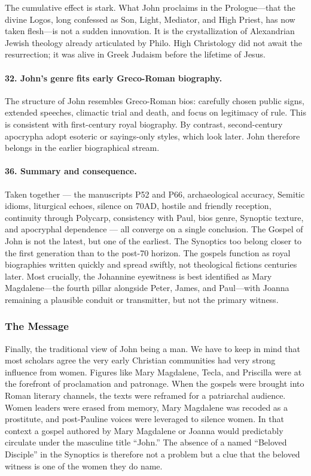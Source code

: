 The cumulative effect is stark.
What John proclaims in the Prologue—that the divine Logos, long confessed as Son, Light, Mediator, and High Priest, has now taken flesh—is not a sudden innovation.
It is the crystallization of Alexandrian Jewish theology already articulated by Philo.
High Christology did not await the resurrection; it was alive in Greek Judaism before the lifetime of Jesus.

\paragraph{32.
John’s genre fits early Greco-Roman biography.}\label{par:johns-genre-fits-early-greco-roman-biography.}

The structure of John resembles Greco-Roman bios: carefully chosen public signs, extended speeches, climactic trial and death, and focus on legitimacy of rule.
This is consistent with first-century royal biography.
By contrast, second-century apocrypha adopt esoteric or sayings-only styles, which look later.
John therefore belongs in the earlier biographical stream.

\paragraph{36.
Summary and consequence.}\label{par:summary-and-consequence.}

Taken together --- the manuscripts P52 and P66, archaeological accuracy, Semitic idioms, liturgical echoes, silence on 70AD, hostile and friendly reception, continuity through Polycarp, consistency with Paul, bios genre, Synoptic texture, and apocryphal dependence --- all converge on a single conclusion.
The Gospel of John is not the latest, but one of the earliest.
The Synoptics too belong closer to the first generation than to the post-70 horizon.
The gospels function as royal biographies written quickly and spread swiftly, not theological fictions centuries later.
Most crucially, the Johannine eyewitness is best identified as Mary Magdalene—the fourth pillar alongside Peter, James, and Paul—with Joanna remaining a plausible conduit or transmitter, but not the primary witness.

\subsubsection{The Message}\label{subsubsec:the-message}

Finally, the traditional view of John being a man.
We have to keep in mind that most scholars agree the very early Christian communities had very strong influence from women.
Figures like Mary Magdalene, Tecla, and Priscilla were at the forefront of proclamation and patronage.
When the gospels were brought into Roman literary channels, the texts were reframed for a patriarchal audience.
Women leaders were erased from memory, Mary Magdalene was recoded as a prostitute, and post-Pauline voices were leveraged to silence women.
In that context a gospel authored by Mary Magdalene or Joanna would predictably circulate under the masculine title “John.”
The absence of a named “Beloved Disciple” in the Synoptics is therefore not a problem but a clue that the beloved witness is one of the women they do name.

